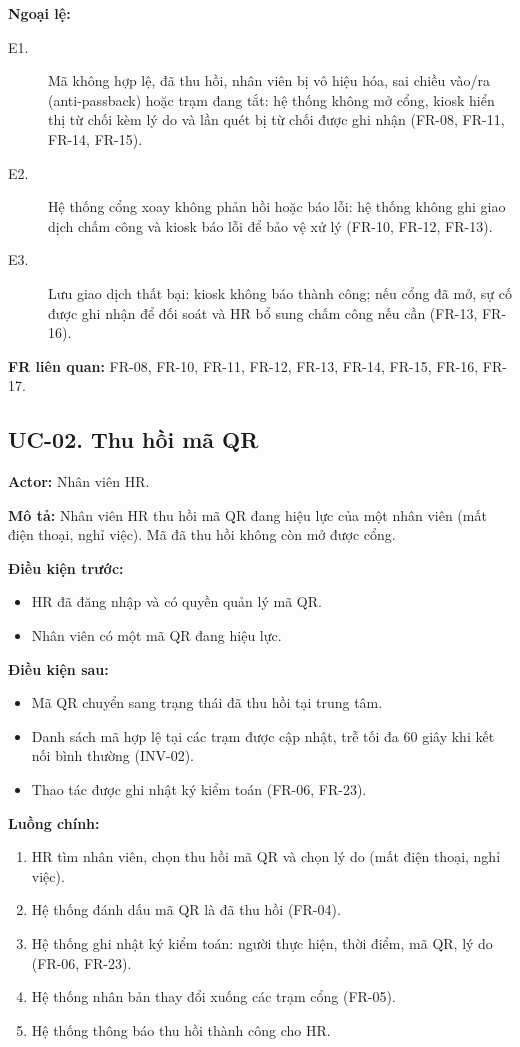 \noindent\textbf{Ngoại lệ:}
\begin{description}
    \item[E1.] Mã không hợp lệ, đã thu hồi, nhân viên bị vô hiệu hóa, sai chiều vào/ra (anti-passback) hoặc trạm đang tắt: hệ thống không mở cổng, kiosk hiển thị từ chối kèm lý do và lần quét bị từ chối được ghi nhận (FR-08, FR-11, FR-14, FR-15).
    \item[E2.] Hệ thống cổng xoay không phản hồi hoặc báo lỗi: hệ thống không ghi giao dịch chấm công và kiosk báo lỗi để bảo vệ xử lý (FR-10, FR-12, FR-13).
    \item[E3.] Lưu giao dịch thất bại: kiosk không báo thành công; nếu cổng đã mở, sự cố được ghi nhận để đối soát và HR bổ sung chấm công nếu cần (FR-13, FR-16).
\end{description}

\noindent\textbf{FR liên quan:} FR-08, FR-10, FR-11, FR-12, FR-13, FR-14, FR-15, FR-16, FR-17.

\subsection{UC-02. Thu hồi mã QR}

\noindent\textbf{Actor:} Nhân viên HR.

\noindent\textbf{Mô tả:} Nhân viên HR thu hồi mã QR đang hiệu lực của một nhân viên (mất điện thoại, nghỉ việc). Mã đã thu hồi không còn mở được cổng.

\noindent\textbf{Điều kiện trước:}
\begin{itemize}
    \item HR đã đăng nhập và có quyền quản lý mã QR.
    \item Nhân viên có một mã QR đang hiệu lực.
\end{itemize}

\noindent\textbf{Điều kiện sau:}
\begin{itemize}
    \item Mã QR chuyển sang trạng thái đã thu hồi tại trung tâm.
    \item Danh sách mã hợp lệ tại các trạm được cập nhật, trễ tối đa 60 giây khi kết nối bình thường (INV-02).
    \item Thao tác được ghi nhật ký kiểm toán (FR-06, FR-23).
\end{itemize}

\noindent\textbf{Luồng chính:}
\begin{enumerate}
    \item HR tìm nhân viên, chọn thu hồi mã QR và chọn lý do (mất điện thoại, nghỉ việc).
    \item Hệ thống đánh dấu mã QR là đã thu hồi (FR-04).
    \item Hệ thống ghi nhật ký kiểm toán: người thực hiện, thời điểm, mã QR, lý do (FR-06, FR-23).
    \item Hệ thống nhân bản thay đổi xuống các trạm cổng (FR-05).
    \item Hệ thống thông báo thu hồi thành công cho HR.
\end{enumerate}


